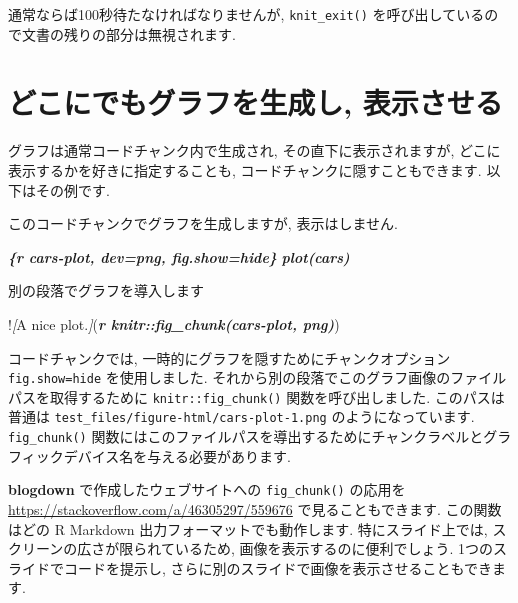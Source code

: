 \documentclass[
  11pt,
]{bxjsreport}
\newenvironment{Shaded}{\begin{snugshade}}{\end{snugshade}}
\newcommand{\CommentTok}[1]{\textcolor[rgb]{0.56,0.35,0.01}{\textit{#1}}}
\newcommand{\InformationTok}[1]{\textcolor[rgb]{0.56,0.35,0.01}{\textbf{\textit{#1}}}}
\newcommand{\NormalTok}[1]{#1}
\newcommand{\OtherTok}[1]{\textcolor[rgb]{0.56,0.35,0.01}{#1}}
\begin{document}
通常ならば100秒待たなければなりませんが, \texttt{knit\_exit()} を呼び出しているので文書の残りの部分は無視されます.

\hypertarget{fig-chunk}{%
\section{どこにでもグラフを生成し, 表示させる}\label{fig-chunk}}

グラフは通常コードチャンク内で生成され, その直下に表示されますが, どこに表示するかを好きに指定することも, コードチャンクに隠すこともできます. 以下はその例です.

\begin{Shaded}
\begin{Highlighting}[]
\NormalTok{このコードチャンクでグラフを生成しますが, 表示はしません.}

\InformationTok{\textasciigrave{}\textasciigrave{}\textasciigrave{}\{r cars{-}plot, dev=\textquotesingle{}png\textquotesingle{}, fig.show=\textquotesingle{}hide\textquotesingle{}\}}
\InformationTok{plot(cars)}
\InformationTok{\textasciigrave{}\textasciigrave{}\textasciigrave{}}

\NormalTok{別の段落でグラフを導入します}

\NormalTok{!}\CommentTok{[}\OtherTok{A nice plot.}\CommentTok{]}\NormalTok{(}\InformationTok{\textasciigrave{}r knitr::fig\_chunk(\textquotesingle{}cars{-}plot\textquotesingle{}, \textquotesingle{}png\textquotesingle{})\textasciigrave{}}\NormalTok{)}
\end{Highlighting}
\end{Shaded}

コードチャンクでは, 一時的にグラフを隠すためにチャンクオプション \texttt{fig.show=\textquotesingle{}hide\textquotesingle{}} を使用しました. それから別の段落でこのグラフ画像のファイルパスを取得するために \texttt{knitr::fig\_chunk()} 関数を呼び出しました. このパスは普通は \texttt{test\_files/figure-html/cars-plot-1.png} のようになっています. \texttt{fig\_chunk()} 関数にはこのファイルパスを導出するためにチャンクラベルとグラフィックデバイス名を与える必要があります.

\textbf{blogdown} で作成したウェブサイトへの \texttt{fig\_chunk()} の応用を \url{https://stackoverflow.com/a/46305297/559676} で見ることもできます. この関数はどの R Markdown 出力フォーマットでも動作します. 特にスライド上では, スクリーンの広さが限られているため, 画像を表示するのに便利でしょう. 1つのスライドでコードを提示し, さらに別のスライドで画像を表示させることもできます.
\end{document}
